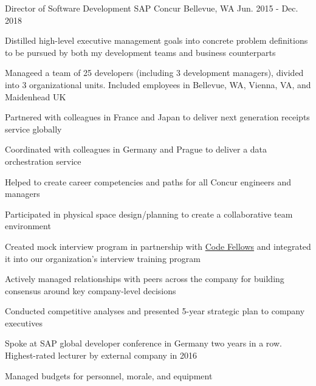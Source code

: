 \begin{cventries}
\cventry
{Director of Software Development}
{SAP Concur}
{Bellevue, WA}
{Jun. 2015 - Dec. 2018}
{
  \begin{cvitems}
  \item {Distilled high-level executive management goals into concrete problem definitions to be pursued by both my development teams and business counterparts}
  \item {Manageed a team of 25 developers (including 3 development managers), divided into 3 organizational units. Included employees in Bellevue, WA, Vienna, VA, and Maidenhead UK}
  \item {Partnered with colleagues in France and Japan to deliver next generation receipts service globally}
  \item {Coordinated with colleagues in Germany and Prague to deliver a data orchestration service}
  \item {Helped to create career competencies and paths for all Concur engineers and managers}
  \item {Participated in physical space design/planning to create a collaborative team environment}
  \item {Created mock interview program in partnership with \href{https://www.codefellows.org/}{Code Fellows} and integrated it into our organization’s interview training program}
  \item {Actively managed relationships with peers across the company for building consensus around key company-level decisions}
  \item {Conducted competitive analyses and presented 5-year strategic plan to company executives}
  \item {Spoke at SAP global developer conference in Germany two years in a row. Highest-rated lecturer by external company in 2016}
  \item {Managed budgets for personnel, morale, and equipment}
  \end{cvitems}
}



\end{cventries}
